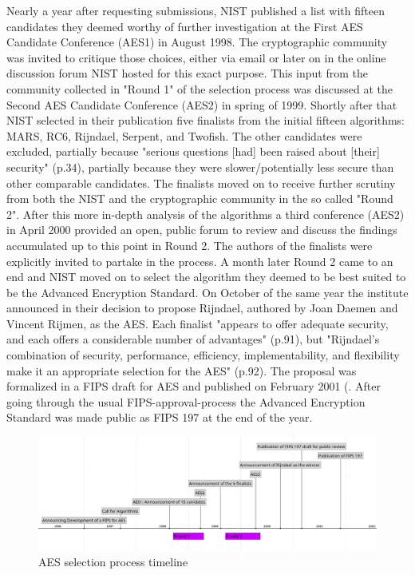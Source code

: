 Nearly a year after requesting submissions, NIST published a list with fifteen candidates they deemed worthy of further investigation at the First AES Candidate Conference (AES1) in August 1998. The cryptographic community was invited to critique those choices, either via email or later on in the online discussion forum NIST hosted for this exact purpose. This input from the community collected in "Round 1" of the selection process was discussed at the Second AES Candidate Conference (AES2) in spring of 1999. Shortly after that NIST selected in their publication \cite{round1report} five finalists from the initial fifteen algorithms: MARS, RC6, Rijndael, Serpent, and Twofish.
The other candidates were excluded, partially because "serious questions [had] been raised about [their] security" (p.34), partially because they were slower/potentially less secure than other comparable candidates.
The finalists moved on to receive further scrutiny from both the NIST and the cryptographic community in the so called "Round 2".
After this more in-depth analysis of the algorithms a third conference (AES2) in April 2000 provided an open, public forum to review and discuss the findings accumulated up to this point in Round 2. The authors of the finalists were explicitly invited to partake in the process. A month later Round 2 came to an end and NIST moved on to select the algorithm they deemed to be best suited to be the Advanced Encryption Standard.
On October of the same year the institute announced in \cite{round2report} their decision to propose Rijndael, authored by Joan Daemen and Vincent Rijmen, as the AES. Each finalist "appears  to  offer adequate security, and each offers a considerable number of advantages" (p.91), but "Rijndael’s combination of security, performance, efficiency, implementability, and flexibility make it an appropriate selection for the AES" (p.92).
The proposal was formalized in a FIPS draft for AES and published on February 2001 (\cite{fipsdraft}. After going through the usual FIPS-approval-process the Advanced Encryption Standard was made public as FIPS 197 \cite{fips197} at the end of the year.

\begin{figure}
\centering
\includegraphics[scale=0.35]{aes-process-timeline.png}
\caption{AES selection process timeline}
\end{figure}

